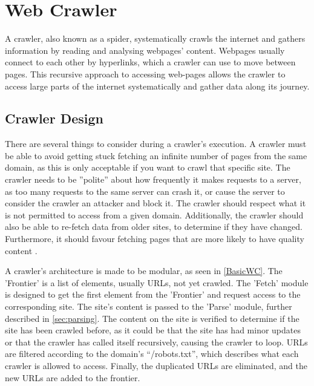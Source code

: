 \section{Web Crawler}\label{subsec:crawler}
A crawler, also known as a spider, systematically crawls the internet
and gathers information by reading and analysing webpages' content. Webpages
usually connect to each other by hyperlinks, which a crawler can use to move
between pages. This recursive approach to accessing web-pages allows the crawler
to access large parts of the internet systematically and gather data along its
journey. \citep[p. 444-445]{manning2008introduction}

\subsection{Crawler Design} 
There are several things to consider during a crawler's execution. A crawler
must be able to avoid getting stuck fetching an infinite number of pages from the
same domain, as this is only acceptable if you want to crawl that specific site.
The crawler needs to be ''polite'' about how frequently it makes requests to a
server, as too many requests to the same server can crash it, or cause the
server to consider the crawler an attacker and block it. The crawler should
respect what it is not permitted to access from a given domain.
Additionally, the crawler should also be able to re-fetch data from older sites,
to determine if they have changed. Furthermore, it should favour fetching pages
that are more likely to have quality content
\citep[ch. 20.1]{manning2008introduction}.\nl

A crawler's architecture is made to be modular, as seen in \autoref{BasicWC}.
The 'Frontier' is a list of elements, usually \acp{URL}, not yet crawled. The
'Fetch' module is designed to get the first element from the 'Frontier' and request
access to the corresponding site. The site's content is passed to the 'Parse'
module, further described in \autoref{sec:parsing}.
The content on the site is verified to determine if the site has been crawled
before, as it could be that the site has had minor updates or that the crawler
has called itself recursively, causing the crawler to loop. \acp{URL} are
filtered according to the domain's ``/robots.txt'', which describes what each crawler is
allowed to access. Finally, the duplicated \acp{URL} are eliminated, and the
new \acp{URL} are added to the frontier.\nl


